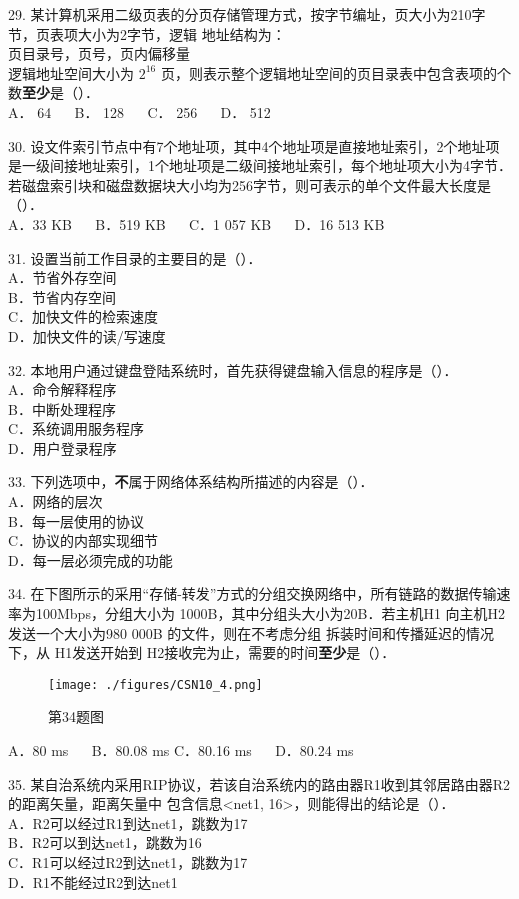 29. 某计算机采用二级页表的分页存储管理方式，按字节编址，页大小为210字节，页表项大小为2字节，逻辑
地址结构为：  \\
页目录号，页号，页内偏移量 \\
逻辑地址空间大小为 $2^{16}$ 页，则表示整个逻辑地址空间的页目录表中包含表项的个数\textbf{至少}是（）． \\
A． 64 $\quad$ B． 128 $\quad$ C． 256 $\quad$ D． 512

30. 设文件索引节点中有7个地址项，其中4个地址项是直接地址索引，2个地址项是一级间接地址索引，1个地址项是二级间接地址索引，每个地址项大小为4字节．若磁盘索引块和磁盘数据块大小均为256字节，则可表示的单个文件最大长度是（）． \\
A．33 KB $\quad$ B．519 KB $\quad$ C．1 057 KB $\quad$ D．16 513 KB

31. 设置当前工作目录的主要目的是（）． \\
A．节省外存空间 \\
B．节省内存空间 \\
C．加快文件的检索速度 \\
D．加快文件的读/写速度

32. 本地用户通过键盘登陆系统时，首先获得键盘输入信息的程序是（）．  \\
A．命令解释程序 \\
B．中断处理程序 \\
C．系统调用服务程序 \\
D．用户登录程序

33. 下列选项中，\textbf{不}属于网络体系结构所描述的内容是（）．  \\
A．网络的层次  \\
B．每一层使用的协议  \\
C．协议的内部实现细节  \\
D．每一层必须完成的功能

34. 在下图所示的采用“存储-转发”方式的分组交换网络中，所有链路的数据传输速率为100Mbps，分组大小为
1000B，其中分组头大小为20B．若主机H1 向主机H2 发送一个大小为980 000B 的文件，则在不考虑分组
拆装时间和传播延迟的情况下，从 H1发送开始到 H2接收完为止，需要的时间\textbf{至少}是（）．  \\
\begin{figure}[ht]
\centering
\texttt{[image: ./figures/CSN10\_4.png]}
\caption{第34题图} \label{CSN10_fig4}
\end{figure}
A．80 ms $\quad$ B．80.08 ms
C．80.16 ms $\quad$ D．80.24 ms

35. 某自治系统内采用RIP协议，若该自治系统内的路由器R1收到其邻居路由器R2的距离矢量，距离矢量中
包含信息<net1, 16>，则能得出的结论是（）．  \\
A．R2可以经过R1到达net1，跳数为17  \\
B．R2可以到达net1，跳数为16  \\
C．R1可以经过R2到达net1，跳数为17  \\
D．R1不能经过R2到达net1  \\

